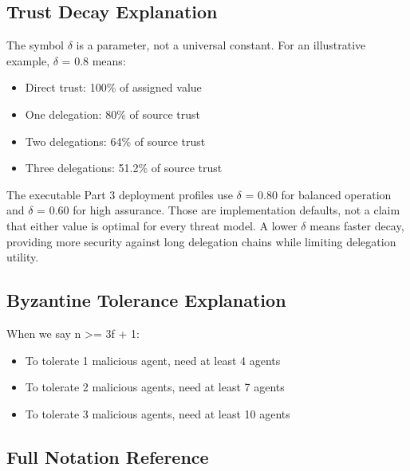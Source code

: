 \documentclass[
]{article}
\providecommand{\tightlist}{%
  \setlength{\itemsep}{0pt}\setlength{\parskip}{0pt}}
\begin{document}
\subsection{Trust Decay Explanation}\label{trust-decay-explanation}

The symbol \texorpdfstring{\ensuremath{\delta}}{delta} is a parameter, not a universal constant. For an
illustrative example, \texorpdfstring{\ensuremath{\delta}}{delta} = 0.8 means:

\begin{itemize}
\tightlist
\item
  Direct trust: 100\% of assigned value
\item
  One delegation: 80\% of source trust
\item
  Two delegations: 64\% of source trust
\item
  Three delegations: 51.2\% of source trust
\end{itemize}

The executable Part 3 deployment profiles use \texorpdfstring{\ensuremath{\delta}}{delta} = 0.80 for balanced
operation and \texorpdfstring{\ensuremath{\delta}}{delta} = 0.60 for high assurance. Those are implementation
defaults, not a claim that either value is optimal for every threat
model. A lower \texorpdfstring{\ensuremath{\delta}}{delta} means faster decay, providing more security against
long delegation chains while limiting delegation utility.

\subsection{Byzantine Tolerance
Explanation}\label{byzantine-tolerance-explanation}

When we say n \texorpdfstring{\textgreater{}=}{>=} 3f + 1:

\begin{itemize}
\tightlist
\item
  To tolerate 1 malicious agent, need at least 4 agents
\item
  To tolerate 2 malicious agents, need at least 7 agents
\item
  To tolerate 3 malicious agents, need at least 10 agents
\end{itemize}

\subsection{Full Notation Reference}\label{full-notation-reference}
\end{document}

